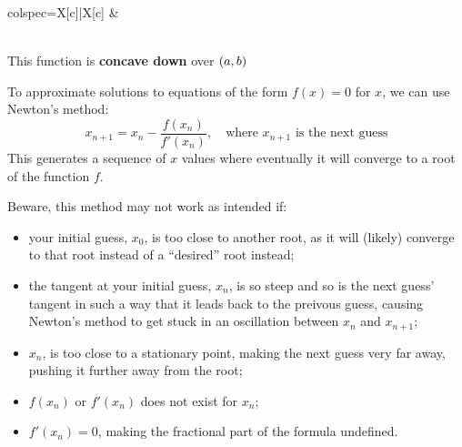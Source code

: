 \documentclass[12pt,a4paper,titlepage]{article}
\DeclarePairedDelimiter {\pars}  {  (      }     {  )      }
\begin{document}
\begin{SummaryBox}[title=Second derivative of a function (concavity), leftlower=0pt, rightlower=0pt]
\begin{tblr}{colspec={X[c]|X[c]}}
                    &
                    
                    {\\
                    This function is \textbf{concave down} over $\pars*{a, b}$}
                \end{tblr}
            \end{SummaryBox}

            \begin{SummaryBox}[title=Newton's method]
                To approximate solutions to equations of the form \( f(x) = 0 \) for \( x \), we can use Newton's method:
                \[
                    x_{n + 1} = x_n - \frac{f(x_n)}{f'(x_n)}, \quad \text{where } x_{n + 1} \text{ is the next guess}
                \]
                This generates a sequence of \( x \) values where eventually it will converge to a root of the function \( f \).

                Beware, this method may not work as intended if:
                \begin{itemize}[leftmargin=*]
                    \item your initial guess, \( x_0 \), is too close to another root, as it will (likely) converge to that root instead of a ``desired'' root instead;
                    \item the tangent at your initial guess, \( x_n \), is so steep and so is the next guess' tangent in such a way that it leads back to the preivous guess, causing Newton's method to get stuck in an oscillation between \( x_n \) and \( x_{n + 1} \);
                    \item \( x_{n} \), is too close to a stationary point, making the next guess very far away, pushing it further away from the root;
                    \item \( f(x_n) \) or \( f'(x_n) \) does not exist for \( x_n \);
                    \item \( f'(x_n) = 0 \), making the fractional part of the formula undefined.
                \end{itemize}
            \end{SummaryBox}
            
\end{document}
